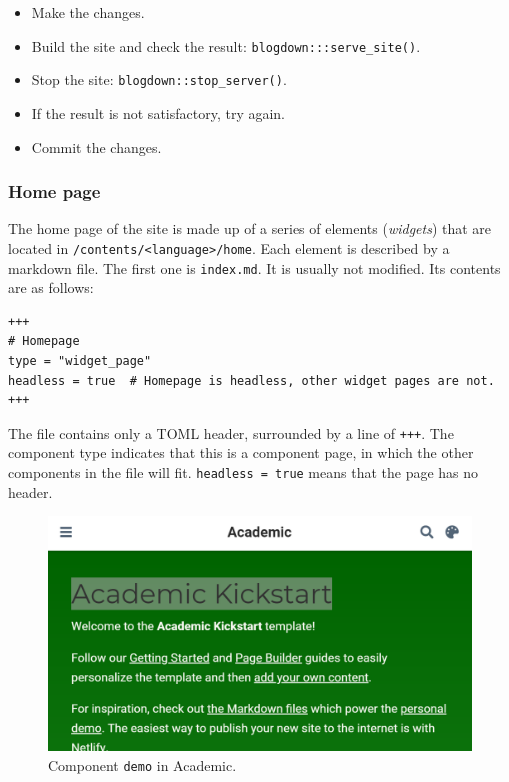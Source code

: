 \documentclass[
  12pt,
  american,
  a4paper,
  extrafontsizes,onecolumn,openright
  ]{memoir}
\providecommand{\tightlist}{%
  \setlength{\itemsep}{0pt}\setlength{\parskip}{0pt}}
\begin{document}
\begin{itemize}
\tightlist
\item
  Make the changes.
\item
  Build the site and check the result: \texttt{blogdown:::serve\_site()}.
\item
  Stop the site: \texttt{blogdown::stop\_server()}.
\item
  If the result is not satisfactory, try again.
\item
  Commit the changes.
\end{itemize}

\subsubsection{Home page}\label{home-page}

The home page of the site is made up of a series of elements (\emph{widgets}) that are located in \texttt{/contents/\textless{}language\textgreater{}/home}.
Each element is described by a markdown file.
The first one is \texttt{index.md}.
It is usually not modified.
Its contents are as follows:

\begin{verbatim}
+++
# Homepage
type = "widget_page"
headless = true  # Homepage is headless, other widget pages are not.
+++
\end{verbatim}

The file contains only a TOML header, surrounded by a line of \texttt{+++}.
The component type indicates that this is a component page, in which the other components in the file will fit.
\texttt{headless\ =\ true} means that the page has no header.



\scriptsize

\begin{figure}

{\centering \includegraphics[width=0.8\linewidth]{images/rediger-demo} 

}

\caption{Component \texttt{demo} in Academic.}\label{fig:rediger-demo}
\end{figure}
\end{document}
